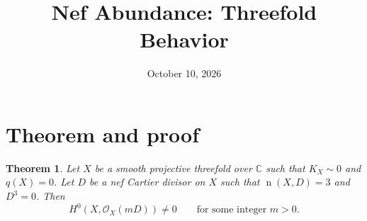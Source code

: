 \documentclass[12pt,a4paper,psamsfonts]{amsart}
\title{Nef Abundance: Threefold Behavior}
\date{October 10, 2026}
\newtheorem*{theorem}{Theorem}
\theoremstyle{definition}
\theoremstyle{plain}
\newcommand{\C}{\mathbb C}
\newcommand{\OO}{\mathcal O}
\newcommand{\nef}{\operatorname{n}}
\begin{document}
\maketitle


\section{Theorem and proof}\label{sec:hard-case}

\begin{theorem}\label{thm:full-nef-nonvanishing}
Let $X$ be a smooth projective threefold over $\C$ such that
$K_X\sim0$ and $q(X)=0$. Let $D$ be a nef Cartier divisor on $X$
such that $\nef(X,D)=3$ and $D^3=0$. Then
\[
 H^0(X,\OO_X(mD))\ne0
 \qquad\text{for some integer }m>0.
\]
\end{theorem}
\end{document}
